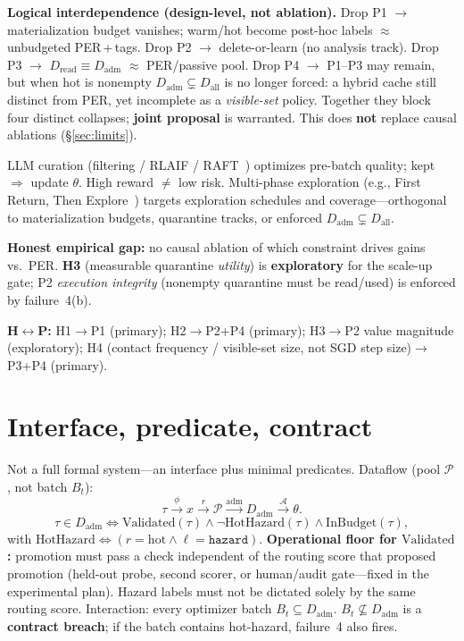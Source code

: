 \documentclass{article}
\begin{document}
\textbf{Logical interdependence (design-level, not ablation).}
 Drop P1 \(\rightarrow\) materialization budget vanishes; warm/hot become post-hoc labels \(\approx\) unbudgeted PER\,+\,tags. Drop P2 \(\rightarrow\) delete-or-learn (no analysis track). Drop P3 \(\rightarrow\) \(D_{\mathrm{read}}\equiv D_{\mathrm{adm}}\) \(\approx\) PER/passive pool. Drop P4 \(\rightarrow\) P1--P3 may remain, but when hot is nonempty \(D_{\mathrm{adm}}\subsetneq D_{\mathrm{all}}\) is no longer forced: a hybrid cache still distinct from PER, yet incomplete as a \emph{visible-set} policy. Together they block four distinct collapses; \textbf{joint proposal} is warranted. This does \textbf{not} replace causal ablations (\S\ref{sec:limits}).

LLM curation (filtering / RLAIF / RAFT~\citep{hu2024preference,lee2023rlaif,dong2023raft}) optimizes pre-batch quality; kept \(\Rightarrow\) update \(\theta\). High reward \(\neq\) low risk. Multi-phase exploration (e.g., First Return, Then Explore~\citep{ecoffet2021first}) targets exploration schedules and coverage---orthogonal to materialization budgets, quarantine tracks, or enforced \(D_{\mathrm{adm}}\subsetneq D_{\mathrm{all}}\).

\textbf{Honest empirical gap:} no causal ablation of which constraint drives gains vs.\ PER. \textbf{H3} (measurable quarantine \emph{utility}) is \textbf{exploratory} for the scale-up gate; P2 \emph{execution integrity} (nonempty quarantine must be read/used) is enforced by failure~4(b).

\textbf{H\(\leftrightarrow\)P:} H1\(\rightarrow\)P1 (primary); H2\(\rightarrow\)P2+P4 (primary); H3\(\rightarrow\)P2 value magnitude (exploratory); H4 (contact frequency / visible-set size, not SGD step size)\(\rightarrow\)P3+P4 (primary).

\section{Interface, predicate, contract}
\label{sec:interface}

Not a full formal system---an interface plus minimal predicates. Dataflow (pool \(\mathcal{P}\), not batch \(B_t\)):
\[
\tau \xrightarrow{\phi} x \xrightarrow{r} \mathcal{P} \xrightarrow{\mathrm{adm}} D_{\mathrm{adm}} \xrightarrow{\mathcal{A}} \theta.
\]
\[
\tau \in D_{\mathrm{adm}} \iff \mathrm{Validated}(\tau) \land \lnot\mathrm{HotHazard}(\tau) \land \mathrm{InBudget}(\tau),
\]
with \(\mathrm{HotHazard} \iff (r{=}\mathrm{hot}\land \ell{=}\texttt{hazard})\). \textbf{Operational floor for \(\mathrm{Validated}\):} promotion must pass a check independent of the routing score that proposed promotion (held-out probe, second scorer, or human/audit gate---fixed in the experimental plan). Hazard labels must not be dictated solely by the same routing score. Interaction: every optimizer batch \(B_t\subseteq D_{\mathrm{adm}}\). \(B_t\not\subseteq D_{\mathrm{adm}}\) is a \textbf{contract breach}; if the batch contains hot-hazard, failure~4 also fires.
\end{document}
